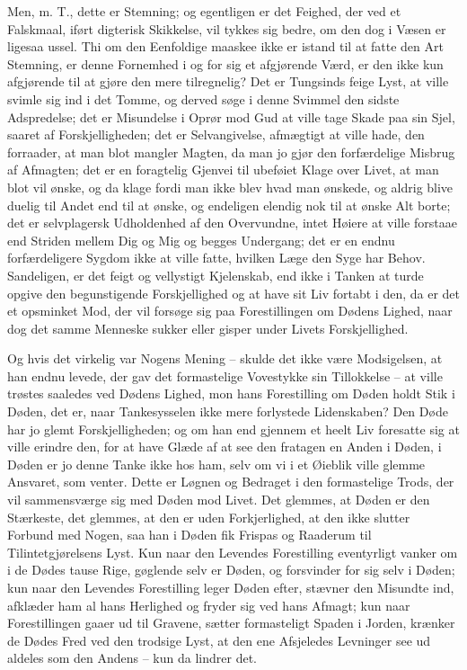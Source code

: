 \documentclass[12pt,a4paper]{article}
\begin{document}
Men, m. T., dette er Stemning; og egentligen er det Feighed, der ved et Falskmaal, iført digterisk Skikkelse, vil tykkes sig bedre, om den dog i Væsen er ligesaa ussel. Thi om den Eenfoldige maaskee ikke er istand til at fatte den Art Stemning, er denne Fornemhed i og for sig et afgjørende Værd, er den ikke kun afgjørende til at gjøre den mere tilregnelig? Det er Tungsinds feige Lyst, at ville svimle sig ind i det Tomme, og derved søge i denne Svimmel den sidste Adspredelse; det er Misundelse i Oprør mod Gud at ville tage Skade paa sin Sjel, saaret af Forskjelligheden; det er Selvangivelse, afmægtigt at ville hade, den forraader, at man blot mangler Magten, da man jo gjør den forfærdelige Misbrug af Afmagten; det er en foragtelig Gjenvei til ubeføiet Klage over Livet, at man blot vil ønske, og da klage fordi man ikke blev hvad man ønskede, og aldrig blive duelig til Andet end til at ønske, og endeligen elendig nok til at ønske Alt borte; det er selvplagersk Udholdenhed af den Overvundne, intet Høiere at ville forstaae end Striden mellem Dig og Mig og begges Undergang; det er en endnu forfærdeligere Sygdom ikke at ville fatte, hvilken Læge den Syge har Behov. Sandeligen, er det feigt og vellystigt Kjelenskab, end ikke i Tanken at turde opgive den begunstigende Forskjellighed og at have sit Liv fortabt i den, da er det et opsminket Mod, der vil forsøge sig paa Forestillingen om Dødens Lighed, naar dog det samme Menneske sukker eller gisper under Livets Forskjellighed.

Og hvis det virkelig var Nogens Mening – skulde det ikke være Modsigelsen, at han endnu levede, der gav det formastelige Vovestykke sin Tillokkelse – at ville trøstes saaledes ved Dødens Lighed, mon hans Forestilling om Døden holdt Stik i Døden, det er, naar Tankesysselen ikke mere forlystede Lidenskaben? Den Døde har jo glemt Forskjelligheden; og om han end gjennem et heelt Liv foresatte sig at ville erindre den, for at have Glæde af at see den fratagen en Anden i Døden, i Døden er jo denne Tanke ikke hos ham, selv om vi i et Øieblik ville glemme Ansvaret, som venter. Dette er Løgnen og Bedraget i den formastelige Trods, der vil sammensværge sig med Døden mod Livet. Det glemmes, at Døden er den Stærkeste, det glemmes, at den er uden Forkjerlighed, at den ikke slutter Forbund med Nogen, saa han i Døden fik Frispas og Raaderum til Tilintetgjørelsens Lyst. Kun naar den Levendes Forestilling eventyrligt vanker om i de Dødes tause Rige, gøglende selv er Døden, og forsvinder for sig selv i Døden; kun naar den Levendes Forestilling leger Døden efter, stævner den Misundte ind, afklæder ham al hans Herlighed og fryder sig ved hans Afmagt; kun naar Forestillingen gaaer ud til Gravene, sætter formasteligt Spaden i Jorden, krænker de Dødes Fred ved den trodsige Lyst, at den ene Afsjeledes Levninger see ud aldeles som den Andens – kun da lindrer det.
\end{document}
